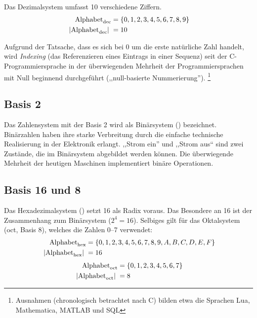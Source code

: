 Das Dezimalsystem umfasst 10 verschiedene Ziffern.
\begin{align*}
         \text{Alphabet}_{\text{dec}} &= \{0, 1, 2, 3, 4, 5, 6, 7, 8, 9\} \\
  \hspace{3pt}\left| \text{Alphabet}_{\text{dec}}\right|\hspace{3pt} &= 10 
\end{align*}

Aufgrund der Tatsache, dass es sich bei $0$ um die erste natürliche Zahl handelt,
wird \emph{Indexing} (das Referenzieren eines Eintrags in einer Sequenz) seit der
C-Programmiersprache in der überwiegenden Mehrheit der Programmiersprachen
mit Null beginnend durchgeführt (,,null-basierte Nummerierung'').%
\footnote{Ausnahmen (chronologisch betrachtet nach C) bilden etwa die Sprachen
Lua, Mathematica, MATLAB und SQL}
%
\subsection{Basis 2}
%
Das Zahlensystem mit der Basis 2 wird als Binärsystem () bezeichnet.
Binärzahlen  haben ihre starke Verbreitung durch die einfache technische
Realisierung in der Elektronik erlangt. ,,Strom ein'' und ,,Strom aus``
sind zwei Zustände, die im Binärsystem abgebildet werden können.
Die überwiegende Mehrheit der heutigen Maschinen
implementiert binäre Operationen.
%
\subsection{Basis 16 und 8}
%
Das Hexadezimalsystem () setzt 16 als Radix voraus. Das Besondere an
16 ist der Zusammenhang zum Binärsystem ($2^4 = 16$). Selbiges gilt für
das Oktalsystem (oct, Basis 8), welches die Zahlen 0--7 verwendet:
%
\begin{align*}
  \text{Alphabet}_{\text{hex}} &= \{0, 1, 2, 3, 4, 5, 6, 7, 8, 9, A, B, C, D, E, F\} \\
  \hspace{3pt}\left| \text{Alphabet}_{\text{hex}}\right|\hspace{3pt} &= 16 
\end{align*}
%
\begin{align*}
  \text{Alphabet}_{\text{oct}} &= \{0, 1, 2, 3, 4, 5, 6, 7\} \\
  \hspace{3pt}\left| \text{Alphabet}_{\text{oct}}\right|\hspace{3pt} &= 8
\end{align*}
%

